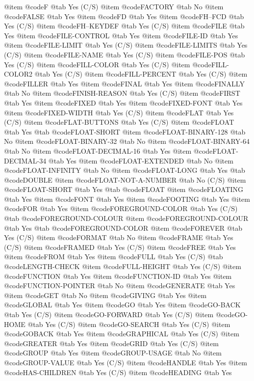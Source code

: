 @item @code{F} @tab Yes (C/S)
@item @code{FACTORY} @tab No
@item @code{FALSE} @tab Yes
@item @code{FD} @tab Yes
@item @code{FH--FCD} @tab Yes (C/S)
@item @code{FH--KEYDEF} @tab Yes (C/S)
@item @code{FILE} @tab Yes
@item @code{FILE-CONTROL} @tab Yes
@item @code{FILE-ID} @tab Yes
@item @code{FILE-LIMIT} @tab Yes (C/S)
@item @code{FILE-LIMITS} @tab Yes (C/S)
@item @code{FILE-NAME} @tab Yes (C/S)
@item @code{FILE-POS} @tab Yes (C/S)
@item @code{FILL-COLOR} @tab Yes (C/S)
@item @code{FILL-COLOR2} @tab Yes (C/S)
@item @code{FILL-PERCENT} @tab Yes (C/S)
@item @code{FILLER} @tab Yes
@item @code{FINAL} @tab Yes
@item @code{FINALLY} @tab No
@item @code{FINISH-REASON} @tab Yes (C/S)
@item @code{FIRST} @tab Yes
@item @code{FIXED} @tab Yes
@item @code{FIXED-FONT} @tab Yes
@item @code{FIXED-WIDTH} @tab Yes (C/S)
@item @code{FLAT} @tab Yes (C/S)
@item @code{FLAT-BUTTONS} @tab Yes (C/S)
@item @code{FLOAT} @tab Yes @tab @code{FLOAT-SHORT}
@item @code{FLOAT-BINARY-128} @tab No
@item @code{FLOAT-BINARY-32} @tab No
@item @code{FLOAT-BINARY-64} @tab No
@item @code{FLOAT-DECIMAL-16} @tab Yes
@item @code{FLOAT-DECIMAL-34} @tab Yes
@item @code{FLOAT-EXTENDED} @tab No
@item @code{FLOAT-INFINITY} @tab No
@item @code{FLOAT-LONG} @tab Yes @tab @code{DOUBLE}
@item @code{FLOAT-NOT-A-NUMBER} @tab No (C/S)
@item @code{FLOAT-SHORT} @tab Yes @tab @code{FLOAT}
@item @code{FLOATING} @tab Yes
@item @code{FONT} @tab Yes
@item @code{FOOTING} @tab Yes
@item @code{FOR} @tab Yes
@item @code{FOREGROUND-COLOR} @tab Yes (C/S) @tab @code{FOREGROUND-COLOUR}
@item @code{FOREGROUND-COLOUR} @tab Yes @tab @code{FOREGROUND-COLOR}
@item @code{FOREVER} @tab Yes (C/S)
@item @code{FORMAT} @tab No
@item @code{FRAME} @tab Yes (C/S)
@item @code{FRAMED} @tab Yes (C/S)
@item @code{FREE} @tab Yes
@item @code{FROM} @tab Yes
@item @code{FULL} @tab Yes (C/S) @tab @code{LENGTH-CHECK}
@item @code{FULL-HEIGHT} @tab Yes (C/S)
@item @code{FUNCTION} @tab Yes
@item @code{FUNCTION-ID} @tab Yes
@item @code{FUNCTION-POINTER} @tab No
@item @code{GENERATE} @tab Yes
@item @code{GET} @tab No
@item @code{GIVING} @tab Yes
@item @code{GLOBAL} @tab Yes
@item @code{GO} @tab Yes
@item @code{GO-BACK} @tab Yes (C/S)
@item @code{GO-FORWARD} @tab Yes (C/S)
@item @code{GO-HOME} @tab Yes (C/S)
@item @code{GO-SEARCH} @tab Yes (C/S)
@item @code{GOBACK} @tab Yes
@item @code{GRAPHICAL} @tab Yes (C/S)
@item @code{GREATER} @tab Yes
@item @code{GRID} @tab Yes (C/S)
@item @code{GROUP} @tab Yes
@item @code{GROUP-USAGE} @tab No
@item @code{GROUP-VALUE} @tab Yes (C/S)
@item @code{HANDLE} @tab Yes
@item @code{HAS-CHILDREN} @tab Yes (C/S)
@item @code{HEADING} @tab Yes
